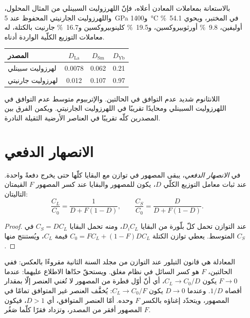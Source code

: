 بالاستعانة بمعاملات المعادن أعلاه، فإنّ اللهرزوليت السبينلي من المثال المحلول،
واللهرزوليت الجارنيتي المحفوظ عند \qty{5}{GPa}
و\qty{1400}{\celsius} في المختبر، ويحوي \qty{54.1}{\percent} أوليفين،
\qty{9.8}{\percent} أورثوبيروكسين، و\qty{19.5}{\percent} كلينوبيروكسين
و\qty{16.7}{\percent} جارنيت بالكتلة، له معاملات التوزيع الكلّية الواردة أدناه.
\begin{center}
\small
\begin{tabular}{lccc}
\hline
المصدر & $D_{\mathrm{La}}$ & $D_{\mathrm{Sm}}$ & $D_{\mathrm{Yb}}$ \\
\hline
لهرزوليت سبينلي & 0.0078 & 0.062 & 0.21 \\
لهرزوليت جارنيتي & 0.012 & 0.107 & 0.97 \\
\hline
\end{tabular}
\end{center}
اللانثانوم شديد عدم التوافق في الحالتين. والإتربيوم متوسط عدم التوافق
في اللهرزوليت السبينلي ومحايدًا تقريبًا في اللهرزوليت الجارنيتي. ويكمن
الفرق بين المصدرين كلّه تقريبًا في العناصر الأرضية الثقيلة
النادرة.

\section{الانصهار الدفعي}\label{sec:b3:trace-element-modelling:batch}

\begin{theorem}\label{thm:b3:trace-element-modelling:batch}
في \emph{الانصهار الدفعي}، يبقى المصهور في توازن
مع البقايا كلّها حتى يخرج دفعةً واحدة. عند ثبات معامل التوزيع الكلّي
$D$، يكون للمصهور والبقايا عند كسر المصهور $F$
القيمتان التاليتان:
\[
\frac{C_L}{C_0} = \frac{1}{D + F(1 - D)}, \qquad
\frac{C_S}{C_0} = \frac{D}{D + F(1 - D)}.
\]
\end{theorem}

\begin{proof}
عند التوازن تحمل كلّ بلّورة من البقايا $D_iC_L$، ومنه تحمل البقايا
$C_S = DC_L$ في المتوسط. يعطي توازن الكتلة $C_0 = FC_L + (1 - F)DC_L$
قيمة $C_L$، ويُستنتج منها $C_S$.
\end{proof}

المعادلة هي قانون التبلور عند التوازن من مجلد السنة الثانية مقروءًا
بالعكس: ففي الحالتين، $F$ هو كسر السائل في نظام مغلق. ويستحقّ حدّاها
الاطلاع عليهما: عندما $F \to 0$ يكون $C_L \to C_0/D$، أي أنّ أوّل قطرة من المصهور
لا تُغني العنصر إلّا بمقدار أقصاه $1/D$. وعندما $D \to 0$ يكون $C_L \to
C_0/F$: يُخفَّف العنصر غير المتوافق تمامًا في المصهور، ويتحدّد
إغناؤه بالكسر $F$ وحده. أمّا العنصر المتوافق، أي $D > 1$، فيكون المصهور
أفقر من المصدر، وتزداد فقرًا كلّما صَغُر $F$.


